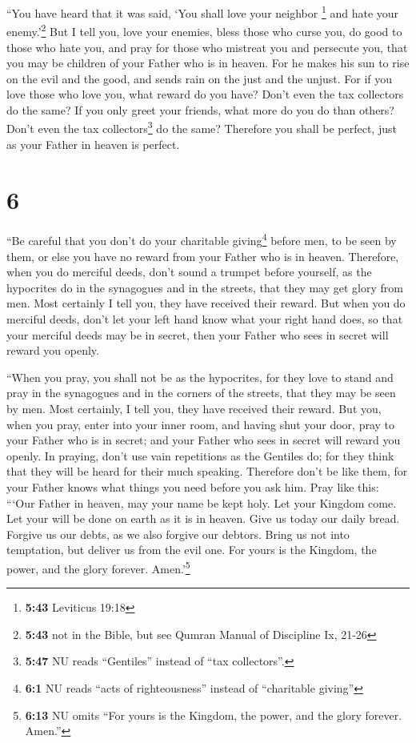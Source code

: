 ``You have heard that it was said, `You shall love your
neighbor \footnote{\textbf{5:43} Leviticus 19:18} and hate your
enemy.'\footnote{\textbf{5:43} not in the Bible, but see Qumran Manual
  of Discipline Ix, 21-26}  But I tell you, love your
enemies, bless those who curse you, do good to those who hate you, and
pray for those who mistreat you and persecute you,  that
you may be children of your Father who is in heaven. For he makes his
sun to rise on the evil and the good, and sends rain on the just and the
unjust.  For if you love those who love you, what reward
do you have? Don't even the tax collectors do the same? 
If you only greet your friends, what more do you do than others? Don't
even the tax collectors\footnote{\textbf{5:47} NU reads ``Gentiles''
  instead of ``tax collectors''.} do the same?  Therefore
you shall be perfect, just as your Father in heaven is perfect.

\hypertarget{section-5}{%
\section{6}\label{section-5}}

 ``Be careful that you don't do your charitable
giving\footnote{\textbf{6:1} NU reads ``acts of righteousness'' instead
  of ``charitable giving''} before men, to be seen by them, or else you
have no reward from your Father who is in heaven. 
Therefore, when you do merciful deeds, don't sound a trumpet before
yourself, as the hypocrites do in the synagogues and in the streets,
that they may get glory from men. Most certainly I tell you, they have
received their reward.  But when you do merciful deeds,
don't let your left hand know what your right hand does, 
so that your merciful deeds may be in secret, then your Father who sees
in secret will reward you openly.

 ``When you pray, you shall not be as the hypocrites, for
they love to stand and pray in the synagogues and in the corners of the
streets, that they may be seen by men. Most certainly, I tell you, they
have received their reward.  But you, when you pray, enter
into your inner room, and having shut your door, pray to your Father who
is in secret; and your Father who sees in secret will reward you openly.
 In praying, don't use vain repetitions as the Gentiles
do; for they think that they will be heard for their much speaking.
 Therefore don't be like them, for your Father knows what
things you need before you ask him.  Pray like this:
```Our Father in heaven, may your name be kept holy.  Let
your Kingdom come. Let your will be done on earth as it is in heaven.
 Give us today our daily bread.  Forgive
us our debts, as we also forgive our debtors.  Bring us
not into temptation, but deliver us from the evil one. For yours is the
Kingdom, the power, and the glory forever. Amen.'\footnote{\textbf{6:13}
  NU omits ``For yours is the Kingdom, the power, and the glory forever.
  Amen.''}

